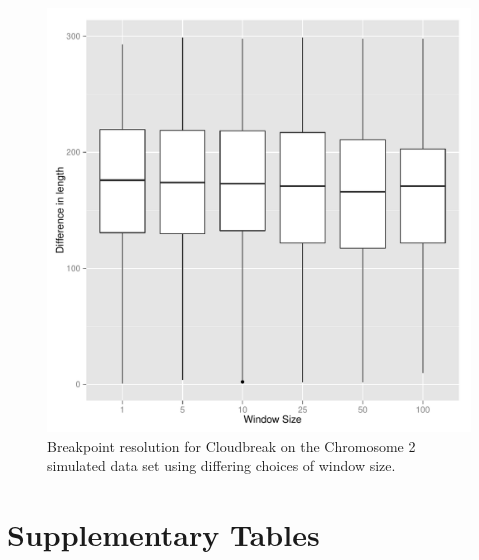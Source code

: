 \documentclass[11pt]{article}
\begin{document}
\begin{figure}
\centering
\includegraphics[width=.8\textwidth]{breakpoint_resolution_by_windowSize.pdf}
\caption[Cloudbreak breakpoint resolution with varying window sizes.]{Breakpoint resolution for Cloudbreak on the Chromosome 2 simulated data set using differing choices of window size.}
\label{breakpoint_resolution_by_windowSize}
\end{figure}

\clearpage

\section{Supplementary Tables}
\end{document}
